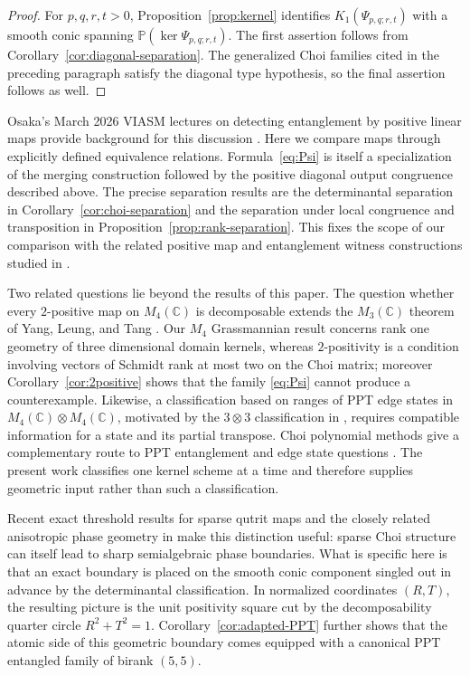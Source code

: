\documentclass[11pt]{amsart}
\newcommand{\chg}[1]{#1}
\newcommand{\newrev}[1]{#1}
\theoremstyle{plain}
\theoremstyle{definition}
\theoremstyle{remark}
\begin{document}
\begin{proof}
\newrev{For $p,q,r,t>0$, Proposition~\ref{prop:kernel} identifies $K_1(\Psi_{p,q;r,t})$ with a smooth conic spanning $\mathbb P(\ker\Psi_{p,q;r,t})$. The first assertion follows from Corollary~\ref{cor:diagonal-separation}. The generalized Choi families cited in the preceding paragraph satisfy the diagonal type hypothesis, so the final assertion follows as well.}
\end{proof}

Osaka's March 2026 VIASM lectures on detecting entanglement by positive linear maps provide background for this discussion \cite{OsakaLectures2026}. Here we compare maps through explicitly defined equivalence relations. Formula~\eqref{eq:Psi} is itself a specialization of the merging construction \cite{MarciniakRutkowski2017} followed by the positive diagonal output congruence described above. The precise separation results are the determinantal separation in Corollary~\ref{cor:choi-separation} and the \chg{separation under local congruence and transposition} in Proposition~\ref{prop:rank-separation}. \newrev{This fixes the scope of our comparison with the related positive map and entanglement witness constructions studied in} \cite{ChoKyeLee1992,Ha1998,SenguptaArvind2011,SenguptaArvind2013}.

Two related questions lie beyond the results of this paper. The question whether every $2$-positive map on $M_4(\mathbb C)$ is decomposable extends the $M_3(\mathbb C)$ theorem of Yang, Leung, and Tang \cite{YangLeungTang2016}. Our $M_4$ Grassmannian result concerns \chg{rank one} geometry of \chg{three dimensional} domain kernels, whereas $2$-positivity is a \chg{condition involving vectors of Schmidt rank at most two} on the Choi matrix; moreover Corollary~\ref{cor:2positive} shows that the family \eqref{eq:Psi} cannot produce a counterexample. Likewise, a \chg{classification based on ranges} of PPT edge states in $M_4(\mathbb C)\otimes M_4(\mathbb C)$, motivated by the $3\otimes3$ classification in \cite{KyeOsaka2012}, requires compatible information for a state and its partial transpose. Choi polynomial methods give a complementary route to PPT entanglement and edge state questions \cite{HoLeLeOsaka2026}. The present work classifies one kernel scheme at a time and therefore supplies geometric input rather than such a classification.

Recent \chg{exact threshold} results for sparse qutrit maps \chg{\cite{PoderiniEtAl2026}} \newrev{and the closely related anisotropic phase geometry in \cite{Sacchi2026}} make this distinction useful: sparse Choi structure can itself lead to sharp semialgebraic phase boundaries. \newrev{What is specific here is that an exact boundary is placed on the smooth conic component singled out in advance by the determinantal classification.} In normalized coordinates $(R,T)$, the resulting picture is the unit positivity square cut by the decomposability quarter circle $R^2+T^2=1$. Corollary~\ref{cor:adapted-PPT} further shows that the atomic side of this geometric boundary comes equipped with a canonical \chg{PPT entangled family of birank $(5,5)$}.
\end{document}
